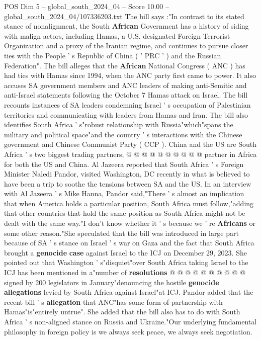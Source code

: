 \begin{textsample}{POS Dim 5 – global\_south\_2024\_04 – Score 10.00 – global\_south\_2024\_04/107336203.txt}  \label{ex:f5_pos_277}
The bill says :"In contrast to its stated stance of nonalignment, the South \textbf{African} Government has a history of siding with malign actors, including Hamas, a U.S. designated Foreign Terrorist Organization and a proxy of the Iranian regime, and continues to pursue closer ties with the People ' s Republic of China ( ' PRC ' ) and the Russian Federation".
The bill alleges that the \textbf{African} National Congress ( ANC ) has had ties with Hamas since 1994, when the ANC party first came to power.
It also accuses SA government members and ANC leaders of making anti-Semitic and anti-Israel statements following the October 7 Hamas attack on Israel.
The bill recounts instances of SA leaders condemning Israel ' s occupation of Palestinian territories and communicating with leaders from Hamas and Iran.
The bill also identifies South Africa ' s"robust relationship with Russia"which"spans the military and political space"and the country ' s interactions with the Chinese government and Chinese Communist Party ( CCP ).
China and the US are South Africa ' s two biggest trading partners, @ @ @ @ @ @ @ @ @ @ partner in Africa for both the US and China.
Al Jazeera reported that South Africa ' s Foreign Minister Naledi Pandor, visited Washington, DC recently in what is believed to have been a trip to soothe the tensions between SA and the US.
In an interview with Al Jazeera ' s Mike Hanna, Pandor said,"There ' s almost an implication that when America holds a particular position, South Africa must follow,"adding that other countries that hold the same position as South Africa might not be dealt with the same way."I don't know whether it ' s because we ' re \textbf{Africans} or some other reason."She speculated that the bill was introduced in large part because of SA ' s stance on Israel ' s war on Gaza and the fact that South Africa brought a \textbf{genocide} \textbf{case} against Israel to the ICJ on December 29, 2023.
She pointed out that Washington ' s"disquiet"over South Africa taking Israel to the ICJ has been mentioned in a"number of \textbf{resolutions} @ @ @ @ @ @ @ @ @ @ signed by 200 legislators in January"denouncing the hostile \textbf{genocide} \textbf{allegations} levied by South Africa against Israel"at ICJ.
Pandor added that the recent bill ' s \textbf{allegation} that ANC"has some form of partnership with Hamas"is"entirely untrue".
She added that the bill also has to do with South Africa ' s non-aligned stance on Russia and Ukraine."Our underlying fundamental philosophy in foreign policy is we always seek peace, we always seek negotiation.

\end{textsample}
